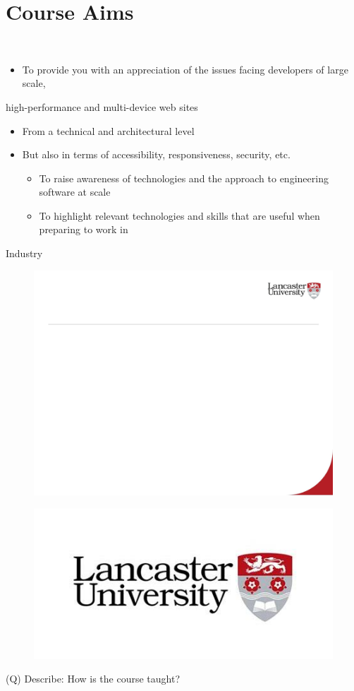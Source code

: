 \documentclass[12pt]{article}
\begin{document}
\section{Course Aims}
\\
\begin{itemize}
  \item To provide you with an appreciation of the issues facing developers of large scale, 
\end{itemize}
high-performance and multi-device web sites\\
\begin{itemize}
  \item From a technical and architectural level
  \item But also in terms of accessibility, responsiveness, security, etc.
\begin{itemize}
  \item To raise awareness of technologies and the approach to engineering software at scale
  \item To highlight relevant technologies and skills that are useful when preparing to work in 
\end{itemize}
\end{itemize}
Industry\\
\begin{figure}[H]
\includegraphics[width=0.5\linewidth]{page3-image-1.png}
\end{figure}
\begin{figure}[H]
\includegraphics[width=0.5\linewidth]{page3-image-2.png}
\end{figure}
\clearpage
(Q)
Describe: How is the course taught?
\clearpage
\end{document}
